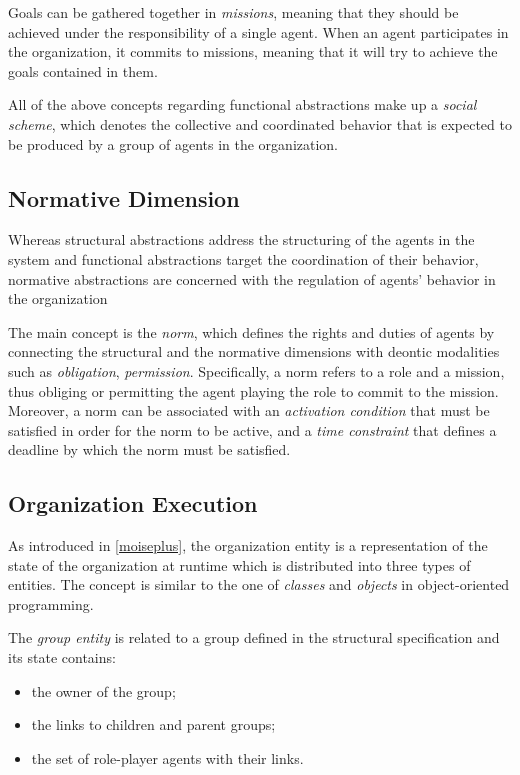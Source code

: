 Goals can be gathered together in \textit{missions}, meaning that they should be achieved under the responsibility of a single agent.
When an agent participates in the organization, it commits to missions, meaning that it will try to achieve the goals contained in them.

All of the above concepts regarding functional abstractions make up a \textit{social scheme}, which denotes the collective and coordinated behavior that is expected to be produced by a group of agents in the organization.

\subsection{Normative Dimension}
Whereas structural abstractions address the structuring of the agents in the system and functional abstractions target the coordination of their behavior, normative abstractions are concerned with the regulation of agents' behavior in the organization

The main concept is the \textit{norm}, which defines the rights and duties of agents by connecting the structural and the normative dimensions with deontic modalities such as \textit{obligation}, \textit{permission}.
Specifically, a norm refers to a role and a mission, thus obliging or permitting the agent playing the role to commit to the mission.
Moreover, a norm can be associated with an \textit{activation condition} that must be satisfied in order for the norm to be active, and a \textit{time constraint} that defines a deadline by which the norm must be satisfied.

\subsection{Organization Execution}
As introduced in \cref{moiseplus}, the organization entity is a representation of the state of the organization at runtime which is distributed into three types of entities.
The concept is similar to the one of \textit{classes} and \textit{objects} in object-oriented programming.

The \textit{group entity} is related to a group defined in the structural specification and its state contains:
\begin{itemize}
    \item the owner of the group;
    \item the links to children and parent groups;
    \item the set of role-player agents with their links.
\end{itemize}


